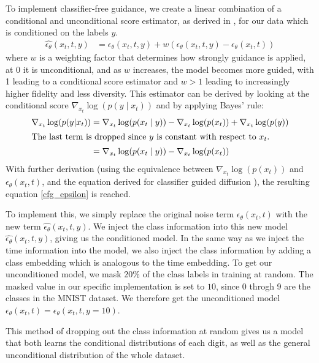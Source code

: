 To implement classifier-free guidance, we create a linear combination of a conditional and unconditional score estimator, as derived in \cite{classifier_free_guidance}, for our data which is conditioned on the labels
$y$.
\begin{align}
  \hat{\epsilon_\theta}(x_t, t, y) &= \epsilon_\theta(x_t, t, y) + w (\epsilon_\theta(x_t, t, y) - \epsilon_\theta(x_t, t))\label{cfg_epsilon}
\end{align}
where $w$ is a weighting factor that determines how strongly guidance is applied, at 0 it is unconditional, and as $w$ increases, the model becomes more guided,
with 1 leading to a conditional score estimator and $w > 1$ leading to increasingly higher fidelity and less diversity.
This estimator can be derived by looking at the conditional score $\nabla_{x_t} \log (p(y \mid x_t))$
and by applying Bayes' rule:
\begin{align}
  \nabla_{x_t} \log (p(y|x_t)) &= \nabla_{x_t} \log (p(x_t \mid y)) - \nabla_{x_t} \log (p(x_t)) + \nabla_{x_t} \log (p(y))\\
  \intertext{The last term is dropped since $y$ is constant with respect to $x_t$.}
  &= \nabla_{x_t} \log (p(x_t \mid y)) - \nabla_{x_t} \log (p(x_t))
\end{align}
With further derivation (using the equivalence between $\nabla_{x_t} \log (p(x_t))$ and $\epsilon_\theta(x_t, t)$, and the equation derived for classifier guided diffusion \cite{classifier_free_guidance}), the resulting equation \ref{cfg_epsilon} is reached. 

To implement this, we simply replace the original noise term $\epsilon_\theta(x_t, t)$ with the new term $\hat{\epsilon_\theta}(x_t, t, y)$.
We inject the class information into this new model $\hat{\epsilon_\theta}(x_t, t, y)$, giving us 
the conditioned model.
In the same way as we inject the time information into the model, we also inject the class information by adding a class embedding
which is analogous to the time embedding.
To get our unconditioned model, we mask 20\% of the class labels in training at random.
The masked value in our specific implementation is set to $10$, since 0 throgh 9 are 
the classes in the MNIST dataset.
We therefore get the unconditioned model $\epsilon_\theta(x_t, t) = \epsilon_\theta(x_t, t, y=10)$.

This method of dropping out the class information at random gives us a model
that both learns the conditional distributions of each digit, as well as the
general unconditional distribution of the whole dataset.


